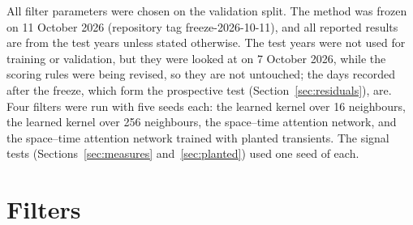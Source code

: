 \documentclass[preprint,12pt,authoryear]{elsarticle}
\begin{document}
All filter parameters were chosen on the validation split. The method was frozen on 11 October 2026 (repository tag freeze-2026-10-11), and all reported results are from the test years unless stated otherwise. The test years were not used for training or validation, but they were looked at on 7 October 2026, while the scoring rules were being revised, so they are not untouched; the days recorded after the freeze, which form the prospective test (Section~\ref{sec:residuals}), are. Four filters were run with five seeds each: the learned kernel over 16 neighbours, the learned kernel over 256 neighbours, the space--time attention network, and the space--time attention network trained with planted transients. The signal tests (Sections~\ref{sec:measures} and~\ref{sec:planted}) used one seed of each.

\section{Filters}
\label{sec:filters}
\end{document}
